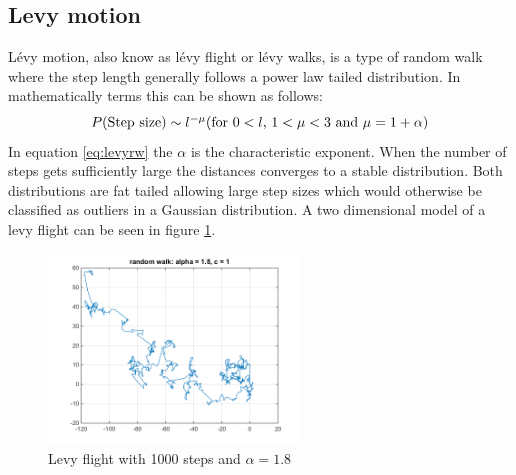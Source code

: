 \subsection{Levy motion}
Lévy motion, also know as lévy flight or lévy walks, is a type of random walk where the step length generally follows a power law tailed distribution. In mathematically terms this can be shown as follows:
\begin{equation}
P($Step size$) \sim l ^{-\mu} ($for $ 0 < l $, $1 < \mu < 3$ and $ \mu = 1 + \alpha)
\label{eq:levyrw}
\end{equation}
In equation \ref{eq:levyrw} the $\alpha$ is the characteristic exponent. When the number of steps gets sufficiently large the distances converges to a stable distribution. Both distributions are fat tailed allowing large step sizes which would otherwise be classified as outliers in a Gaussian distribution. A two dimensional model of a levy flight can be seen in figure \ref{fig:levywalk1}.
\begin{figure}[H]
\centering
\includegraphics[width = 0.6\textwidth]{billeder/levywalk1}
\caption{Levy flight with 1000 steps and $\alpha = 1.8$}
\label{fig:levywalk1}
\end{figure}

